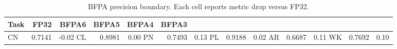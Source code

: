 \begin{table}[t]
\centering
\caption{BFPA precision boundary. Each cell reports metric drop versus FP32.}
\label{tab:bfpa-boundary-sec6}
\begin{tabular}{lrrrrr}
\toprule
Task & FP32 & BFPA6 & BFPA5 & BFPA4 & BFPA3 \\
\midrule
CN & 0.7141 & -0.02%
CL & 0.8981 & 0.00%
PN & 0.7493 & 0.13%
PL & 0.9188 & 0.02%
AR & 0.6687 & 0.11%
WK & 0.7692 & 0.10%
\bottomrule
\end{tabular}
\end{table}
